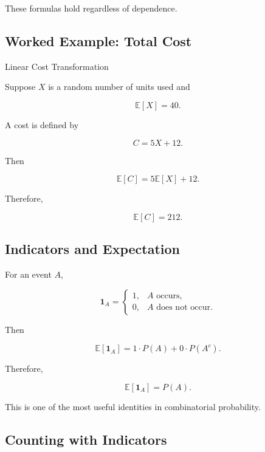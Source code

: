 These formulas hold regardless of dependence.

\subsection{Worked Example: Total Cost}
\label{subsec:worked-linearity-cost}

\begin{workedexamplebox}{Linear Cost Transformation}

Suppose \(X\) is a random number of units used and

\[
\mathbb{E}[X]=40.
\]

A cost is defined by

\[
C=5X+12.
\]

Then

\[
\mathbb{E}[C]
=
5\mathbb{E}[X]+12.
\]

Therefore,

\begin{answerbox}
\[
\boxed{
\mathbb{E}[C]
=
212.
}
\]
\end{answerbox}

\end{workedexamplebox}

\subsection{Indicators and Expectation}
\label{subsec:indicator-expectation}

For an event \(A\),

\[
\mathbf{1}_A
=
\begin{cases}
1,&A\text{ occurs},\\
0,&A\text{ does not occur}.
\end{cases}
\]

Then

\[
\mathbb{E}[\mathbf{1}_A]
=
1\cdot P(A)
+
0\cdot P(A^c).
\]

Therefore,

\[
\boxed{
\mathbb{E}[\mathbf{1}_A]
=
P(A).
}
\]

This is one of the most useful identities in combinatorial probability.

\subsection{Counting with Indicators}
\label{subsec:counting-with-indicators}


